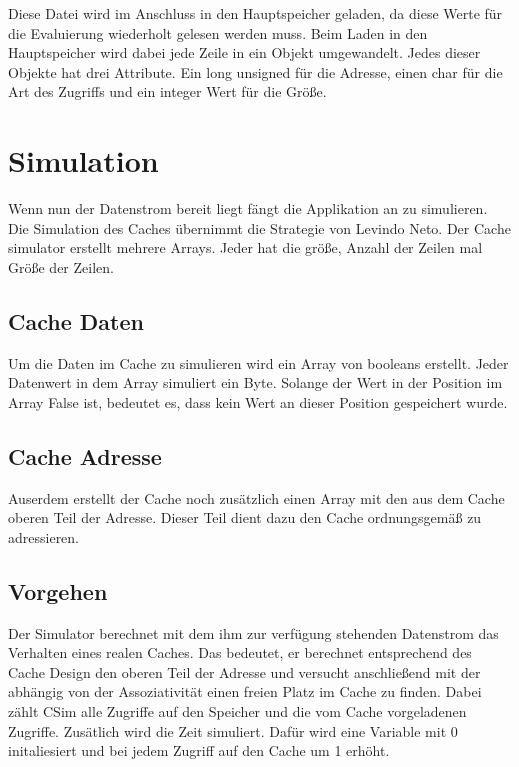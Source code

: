 \documentclass{scrreprt}
\begin{document}
Diese Datei wird im Anschluss in den Hauptspeicher geladen, da diese Werte für die Evaluierung wiederholt gelesen werden muss. Beim Laden in den Hauptspeicher wird dabei jede Zeile in ein Objekt umgewandelt. Jedes dieser Objekte hat drei Attribute. Ein long unsigned für die Adresse, einen char für die Art des Zugriffs und ein integer Wert für die Größe. \newline

\section{Simulation}

Wenn nun der Datenstrom bereit liegt fängt die Applikation an zu simulieren. Die Simulation des Caches übernimmt die Strategie von Levindo Neto. Der Cache simulator erstellt mehrere Arrays. Jeder hat die größe, Anzahl der Zeilen mal Größe der Zeilen.

\subsection{Cache Daten}
Um die Daten im Cache zu simulieren wird ein Array von booleans erstellt. Jeder Datenwert in dem Array simuliert ein Byte. Solange der Wert in der Position im Array False ist, bedeutet es, dass kein Wert an dieser Position gespeichert wurde.

\subsection{Cache Adresse}
Auserdem erstellt der Cache noch zusätzlich einen Array mit den aus dem Cache oberen Teil der Adresse. Dieser Teil dient dazu den Cache ordnungsgemäß zu adressieren.

\subsection{Vorgehen}
Der Simulator berechnet mit dem ihm zur verfügung stehenden Datenstrom das Verhalten eines realen Caches. Das bedeutet, er berechnet entsprechend des Cache Design den oberen Teil der Adresse und versucht anschließend mit der abhängig von der Assoziativität einen freien Platz im Cache zu finden. Dabei zählt CSim alle Zugriffe auf den Speicher und die vom Cache vorgeladenen Zugriffe. Zusätlich wird die Zeit simuliert. Dafür wird eine Variable mit 0 initaliesiert und bei jedem Zugriff auf den Cache um 1 erhöht.
\end{document}
